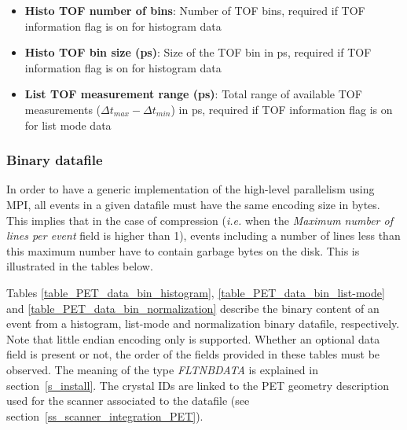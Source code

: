 \documentclass[a4paper, 11pt]{article}
\begin{document}
\begin{itemize}
  \item \textbf{Histo TOF number of bins}: Number of TOF bins, required if TOF information flag is on for histogram data
  \item \textbf{Histo TOF bin size (ps)}: Size of the TOF bin in ps, required if TOF information flag is on for histogram data
  \item \textbf{List TOF measurement range (ps)}: Total range of available TOF measurements ($\Delta t_{max} -\Delta t_{min}$) in ps, required if TOF information flag is on for list mode data
\end{itemize}

\subsubsection{Binary datafile}

In order to have a generic implementation of the high-level parallelism using MPI, all events in a given datafile must have the same encoding size in bytes.
This implies that in the case of compression (\textit{i.e.} when the \textit{Maximum number of lines per event} field is higher than 1), events including a number
of lines less than this maximum number have to contain garbage bytes on the disk. This is illustrated in the tables below.

Tables \ref{table_PET_data_bin_histogram}, \ref{table_PET_data_bin_list-mode} and \ref{table_PET_data_bin_normalization} describe the binary content of
an event from a histogram, list-mode and normalization binary datafile, respectively. Note that little endian encoding only is supported. Whether an
optional data field is present or not, the order of the fields provided in these tables must be observed. The meaning of the type \textit{FLTNBDATA} is
explained in section~\ref{s_install}. The crystal IDs are linked to the PET geometry description used for the scanner associated to the datafile (see
section~\ref{ss_scanner_integration_PET}).
\end{document}
